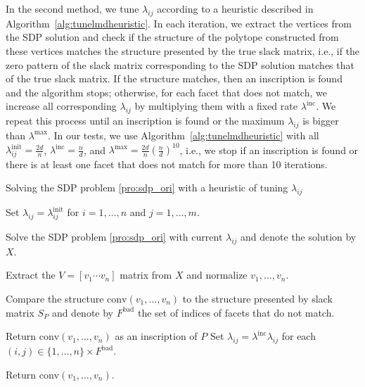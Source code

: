 \documentclass[smallextended, envcountsame]{svjour3}
\begin{document}
    In the second method, we tune $\lambda_{ij}$ according to a heuristic described in Algorithm~\ref{alg:tunelmdheuristic}.  In each iteration, we extract the vertices from the SDP solution and check if the structure of the polytope constructed from these vertices matches the structure presented by the true slack matrix, i.e., if the zero pattern of the slack matrix corresponding to the SDP solution matches that of the true slack matrix.  If the structure matches, then an inscription is found and the algorithm stops; otherwise, for each facet that does not match, we increase all corresponding $\lambda_{ij}$ by multiplying them with a fixed rate $\lambda^{\mathrm{inc}}$.  We repeat this process until an inscription is found or the maximum $\lambda_{ij}$ is bigger than $\lambda^{\max}$.  In our tests, we use Algorithm~\ref{alg:tunelmdheuristic} with all $\lambda_{ij}^{\mathrm{init}}=\frac{2d}{n}$, $\lambda^{\mathrm{inc}}=\frac{n}{d}$, and $\lambda^{\max}=\frac{2d}{n}(\frac{n}{d})^{10}$, i.e., we stop if an inscription is found or there is at least one facet that does not match for more than 10 iterations.
    \begin{algorithm}[!htb]\caption{Solving the SDP problem \eqref{pro:sdp_ori} with a heuristic of tuning $\lambda_{ij}$}\label{alg:tunelmdheuristic}
        Set $\lambda_{ij}=\lambda_{ij}^{\mathrm{init}}$ for $i=1,\ldots,n$ and $j=1,\ldots,m$.
        
        {
            Solve the SDP problem \eqref{pro:sdp_ori} with current $\lambda_{ij}$ and denote the solution by $X$.
            
            Extract the $V=[v_1\cdots v_n]$ matrix from $X$ and normalize $v_1,\ldots,v_n$.
            
             
            Compare the structure $\mathrm{conv}(v_1,\ldots,v_n)$ to the structure presented by slack matrix $S_P$ and denote by $F^{\mathrm{bad}}$ the set of indices of facets that do not match.
                     
            {
                Return $\mathrm{conv}(v_1,\ldots,v_n)$ as an inscription of $P$
            }
            \Else
            {
                Set $\lambda_{ij}=\lambda^{\mathrm{inc}}\lambda_{ij}$ for each $(i,j)\in \{1,\ldots,n\}\times F^{\mathrm{bad}}$.
            }
        }
        Return $\mathrm{conv}(v_1,\ldots,v_n)$.
    \end{algorithm}
\end{document}
